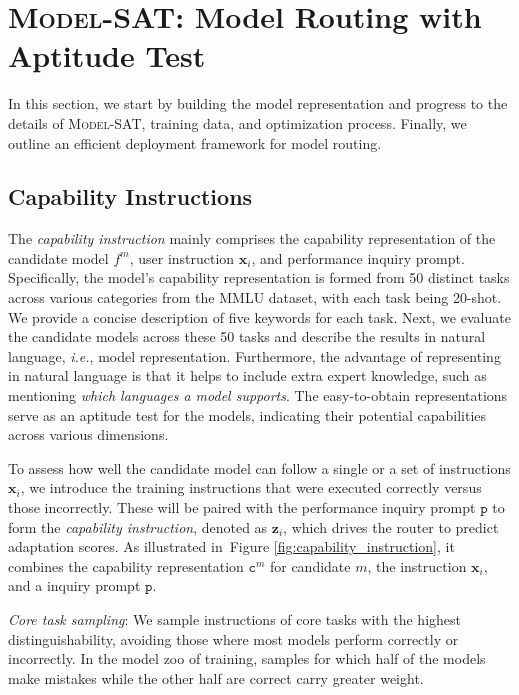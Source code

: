 
\section{{\normalsize \textsc{Model-SAT}}: Model Routing with Aptitude Test}

In this section, we start by building the model representation and progress to the details of \textsc{Model-SAT}, training data, and optimization process. Finally, we outline an efficient deployment framework for model routing.

\subsection{Capability Instructions}
\label{sub_sec:capability_instructions}
The \textit{capability instruction} mainly comprises the capability representation of the candidate model $f^m$, user instruction $\mathbf{x}_i$, and performance inquiry prompt.
Specifically, the model's capability representation is formed from 50 distinct tasks across various categories from the MMLU dataset, with each task being 20-shot. We provide a concise description of five keywords for each task.
Next, we evaluate the candidate models across these 50 tasks and describe the results in natural language, \textit{i.e.}, model representation.
Furthermore, the advantage of representing in natural language is that it helps to include extra expert knowledge, such as mentioning \textit{which languages a model supports}.
The easy-to-obtain representations serve as an aptitude test for the models, indicating their potential capabilities across various dimensions.

To assess how well the candidate model can follow a single or a set of instructions $\mathbf{x}_i$, we introduce the training instructions that were executed correctly versus those incorrectly. These will be paired with the performance inquiry prompt $\texttt{p}$ to form the \textit{capability instruction}, denoted as $\mathbf{z}_i$, which drives the router to predict adaptation scores.
As illustrated in~Figure \ref{fig:capability_instruction}, it combines the capability representation $\texttt{c}^m$ for candidate $m$, the instruction $\mathbf{x}_i$, and a inquiry prompt $\texttt{p}$.

\noindent \textit{Core task sampling}: We sample instructions of core tasks with the highest distinguishability, avoiding those where most models perform correctly or incorrectly. In the model zoo of training, samples for which half of the models make mistakes while the other half are correct carry greater weight.


